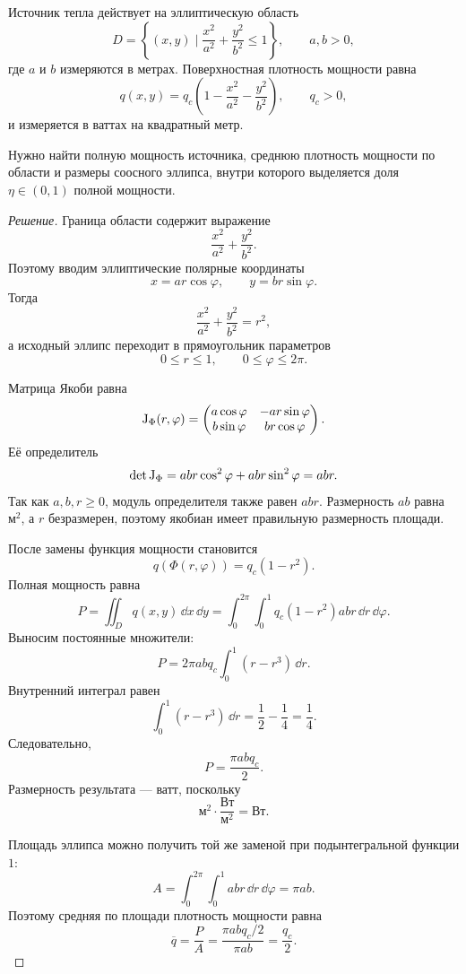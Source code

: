 \begin{problem}
Источник тепла действует на эллиптическую область
\[
D=
\left\{
(x,y)
\mid
\frac{x^2}{a^2}+\frac{y^2}{b^2}\leq1
\right\},
\qquad a,b>0,
\]
где $a$ и $b$ измеряются в метрах. Поверхностная плотность мощности равна
\[
q(x,y)
=
q_c
\left(
1-\frac{x^2}{a^2}-\frac{y^2}{b^2}
\right),
\qquad
q_c>0,
\]
и измеряется в ваттах на квадратный метр.

Нужно найти полную мощность источника, среднюю плотность мощности по области и размеры соосного эллипса, внутри которого выделяется доля $\eta\in(0,1)$ полной мощности.
\end{problem}

\begin{proof}[Решение]
Граница области содержит выражение
\[
\frac{x^2}{a^2}+\frac{y^2}{b^2}.
\]
Поэтому вводим эллиптические полярные координаты
\begin{equation}
\label{eq:elliptic-polar}
x=ar\cos\varphi,
\qquad
y=br\sin\varphi.
\end{equation}
Тогда
\[
\frac{x^2}{a^2}+\frac{y^2}{b^2}
=
r^2,
\]
а исходный эллипс переходит в прямоугольник параметров
\[
0\leq r\leq1,
\qquad
0\leq\varphi\leq2\pi.
\]

Матрица Якоби равна
\[
\mathrm{J}_{\Phi}(r,\varphi)
=
\begin{pmatrix}
 a\cos\varphi&-ar\sin\varphi\\
 b\sin\varphi&br\cos\varphi
\end{pmatrix}.
\]
Её определитель
\[
\det\mathrm{J}_{\Phi}
=
abr\cos^2\varphi
+abr\sin^2\varphi
=abr.
\]
Так как $a,b,r\geq0$, модуль определителя также равен $abr$. Размерность $ab$ равна $\text{м}^2$, а $r$ безразмерен, поэтому якобиан имеет правильную размерность площади.

После замены функция мощности становится
\[
q(\Phi(r,\varphi))
=q_c(1-r^2).
\]
Полная мощность равна
\[
P
=
\iint_Dq(x,y)\,\dd x\,\dd y
=
\int_0^{2\pi}\int_0^1
q_c(1-r^2)abr
\,\dd r\,\dd\varphi.
\]
Выносим постоянные множители:
\[
P
=2\pi abq_c
\int_0^1(r-r^3)\,\dd r.
\]
Внутренний интеграл равен
\[
\int_0^1(r-r^3)\,\dd r
=
\frac12-\frac14
=
\frac14.
\]
Следовательно,
\begin{equation}
\label{eq:total-elliptic-power}
P
=
\frac{\pi abq_c}{2}.
\end{equation}
Размерность результата --- ватт, поскольку
\[
\text{м}^2\cdot\frac{\text{Вт}}{\text{м}^2}
=
\text{Вт}.
\]

Площадь эллипса можно получить той же заменой при подынтегральной функции $1$:
\[
A
=
\int_0^{2\pi}\int_0^1abr\,\dd r\,\dd\varphi
=
\pi ab.
\]
Поэтому средняя по площади плотность мощности равна
\[
\overline q
=
\frac{P}{A}
=
\frac{\pi abq_c/2}{\pi ab}
=
\frac{q_c}{2}.
\]


\end{proof}
